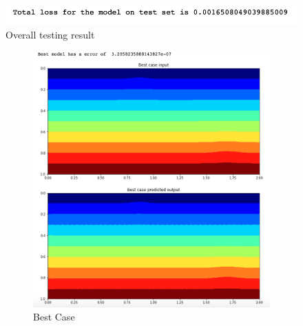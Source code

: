 \begin{figure}[H]
    \caption{Overall testing result}
    \includegraphics[scale=0.8]{Report LaTeX/figures/mantle_convection_images/larger_dataset/ConvAE_OverallTesting.png}
\end{figure}

\begin{figure}[H]
\centering
\begin{subfigure}{0.45\textwidth}
    \includegraphics[width=\textwidth]{Report LaTeX/figures/mantle_convection_images/larger_dataset/ConvAE_Best.png}
    \caption{Best Case}
    \label{fig:first}
\end{subfigure}
\hfill
\begin{subfigure}{0.45\textwidth}

\end{subfigure}
\end{figure}
